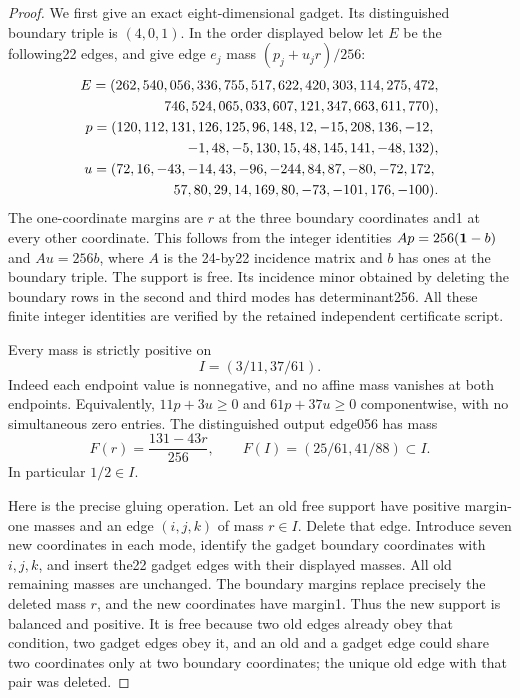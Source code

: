 \begin{proof}
We first give an exact eight-dimensional gadget.  Its distinguished
boundary triple is $(4,0,1)$.  In the order displayed below let $E$
be the following22 edges, and give edge $e_j$ mass
$(p_j+u_jr)/256$:
\[
\begin{gathered}
E=(262,540,056,336,755,517,622,420,303,114,275,472,\\
\hfill746,524,065,033,607,121,347,663,611,770),\\
p=(120,112,131,126,125,96,148,12,-15,208,136,-12,\\
\hfill-1,48,-5,130,15,48,145,141,-48,132),\\
u=(72,16,-43,-14,43,-96,-244,84,87,-80,-72,172,\\
\hfill57,80,29,14,169,80,-73,-101,176,-100).
\end{gathered}
\]
The one-coordinate margins are $r$ at the three boundary coordinates
and1 at every other coordinate.  This follows from the integer
identities $Ap=256({\bf1}-b)$ and $Au=256b$, where $A$ is the
24-by22 incidence matrix and $b$ has ones at the boundary triple.
The support is free.  Its incidence minor obtained by deleting the
boundary rows in the second and third modes has determinant256.
All these finite integer identities are verified by the retained
independent certificate script.

Every mass is strictly positive on
\[
                         I=(3/11,37/61).                      \tag{K-018b}
\]
Indeed each endpoint value is nonnegative, and no affine mass
vanishes at both endpoints.  Equivalently,
$11p+3u\ge0$ and $61p+37u\ge0$ componentwise, with no simultaneous
zero entries.  The distinguished output edge056 has mass
\[
             F(r)=\frac{131-43r}{256},\qquad
             F(I)=(25/61,41/88)\subset I.                    \tag{K-018c}
\]
In particular $1/2\in I$.

Here is the precise gluing operation.  Let an old free support have
positive margin-one masses and an edge $(i,j,k)$ of mass $r\in I$.
Delete that edge.  Introduce seven new coordinates in each mode,
identify the gadget boundary coordinates with $i,j,k$, and insert
the22 gadget edges with their displayed masses.  All old remaining
masses are unchanged.  The boundary margins replace precisely the
deleted mass $r$, and the new coordinates have margin1.  Thus the
new support is balanced and positive.  It is free because two old
edges already obey that condition, two gadget edges obey it, and
an old and a gadget edge could share two coordinates only at two
boundary coordinates; the unique old edge with that pair was
deleted.


\end{proof}
